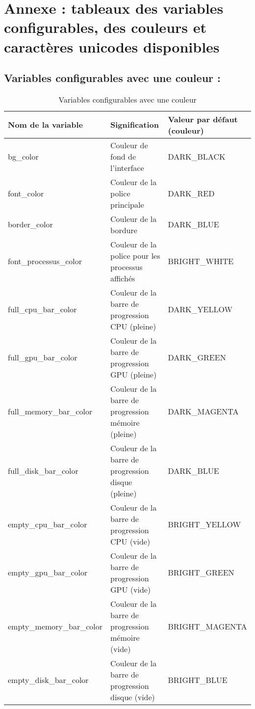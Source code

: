 \documentclass{article}
\begin{document}
\newpage
\section{Annexe : tableaux des variables configurables, des couleurs et caractères unicodes disponibles}
\vspace{3em}
\subsection{Variables configurables avec une couleur :}
\begin{table}[h!]
    \centering
    \renewcommand{\arraystretch}{1.5}
    \footnotesize
    \begin{tabular}{|>{\centering\arraybackslash}m{3.5cm}|>{\centering\arraybackslash}m{3.8cm}|>{\centering\arraybackslash}m{3cm}|}
        \hline
        \textbf{Nom de la variable} & \textbf{Signification} & \textbf{Valeur par défaut (couleur)} \\
        \hline
        bg\_color & Couleur de fond de l'interface & DARK\_BLACK \\
        \hline
        font\_color & Couleur de la police principale & DARK\_RED \\
        \hline
        border\_color & Couleur de la bordure & DARK\_BLUE \\
        \hline
        font\_processus\_color & Couleur de la police pour les processus affichés & BRIGHT\_WHITE \\
        \hline
        full\_cpu\_bar\_color & Couleur de la barre de progression CPU (pleine) & DARK\_YELLOW \\
        \hline
        full\_gpu\_bar\_color & Couleur de la barre de progression GPU (pleine) & DARK\_GREEN \\
        \hline
        full\_memory\_bar\_color & Couleur de la barre de progression mémoire (pleine) & DARK\_MAGENTA \\
        \hline
        full\_disk\_bar\_color & Couleur de la barre de progression disque (pleine) & DARK\_BLUE \\
        \hline
        empty\_cpu\_bar\_color & Couleur de la barre de progression CPU (vide) & BRIGHT\_YELLOW \\
        \hline
        empty\_gpu\_bar\_color & Couleur de la barre de progression GPU (vide) & BRIGHT\_GREEN \\
        \hline
        empty\_memory\_bar\_color & Couleur de la barre de progression mémoire (vide) & BRIGHT\_MAGENTA \\
        \hline
        empty\_disk\_bar\_color & Couleur de la barre de progression disque (vide) & BRIGHT\_BLUE \\
        \hline
    \end{tabular}
    \label{tab:configable_color_var}
    \caption{Variables configurables avec une couleur}
\end{table}
\end{document}
